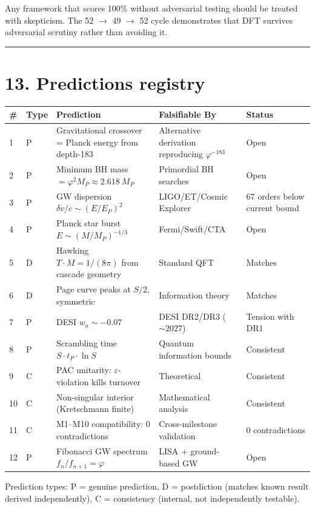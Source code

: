 \documentclass[11pt,a4paper]{article}
\begin{document}
Any framework that scores 100\% without adversarial testing should be treated with skepticism. The 52 $\to$ 49 $\to$ 52 cycle demonstrates that DFT survives adversarial scrutiny rather than avoiding it.

\begin{center}\rule{0.5\linewidth}{0.4pt}\end{center}

\section*{13. Predictions registry}

\begin{longtable}[]{@{}lllll@{}}
\toprule
\# & Type & Prediction & Falsifiable By & Status \\
\midrule\endhead
1 & P & Gravitational crossover = Planck energy from depth-183 & Alternative derivation reproducing $\varphi^{-183}$ & Open \\
2 & P & Minimum BH mass $= \varphi^2 M_P \approx 2.618\ M_P$ & Primordial BH searches & Open \\
3 & P & GW dispersion $\delta v/c \sim (E/E_P)^2$ & LIGO/ET/Cosmic Explorer & 67 orders below current bound \\
4 & P & Planck star burst $E \sim (M/M_P)^{-1/3}$ & Fermi/Swift/CTA & Open \\
5 & D & Hawking $T \cdot M = 1/(8\pi)$ from cascade geometry & Standard QFT & Matches \\
6 & D & Page curve peaks at $S/2$, symmetric & Information theory & Matches \\
7 & P & DESI $w_a \sim -0.07$ & DESI DR2/DR3 ($\sim 2027$) & Tension with DR1 \\
8 & P & Scrambling time $S \cdot t_P \cdot \ln S$ & Quantum information bounds & Consistent \\
9 & C & PAC unitarity: $\varepsilon$-violation kills turnover & Theoretical & Consistent \\
10 & C & Non-singular interior (Kretschmann finite) & Mathematical analysis & Consistent \\
11 & C & M1–M10 compatibility: 0 contradictions & Cross-milestone validation & 0 contradictions \\
12 & P & Fibonacci GW spectrum $f_n/f_{n+1} = \varphi$ & LISA + ground-based GW & Open \\
\bottomrule
\end{longtable}

Prediction types: P = genuine prediction, D = postdiction (matches known result derived independently), C = consistency (internal, not independently testable).
\end{document}
